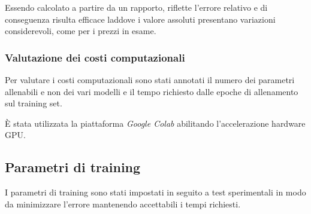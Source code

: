 Essendo calcolato a partire da un rapporto, riflette l'errore relativo e di
conseguenza risulta efficace laddove i valore assoluti presentano variazioni
considerevoli, come per i prezzi in esame.


\subsubsection{Valutazione dei costi computazionali}

Per valutare i costi computazionali sono stati annotati il numero dei parametri
allenabili e non dei vari modelli e il tempo richiesto dalle epoche di
allenamento sul training set.

È stata utilizzata la piattaforma \textit{Google Colab} abilitando l'accelerazione hardware GPU.

\subsection{Parametri di training}

I parametri di training sono stati impostati in seguito a test sperimentali in
modo da minimizzare l'errore mantenendo accettabili i tempi richiesti.
